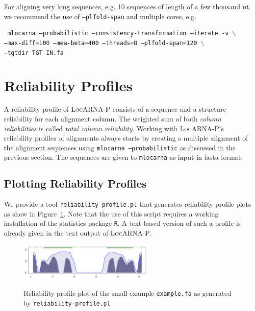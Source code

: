 \documentclass{article}
\newcommand{\LocARNAP}{\textsc{LocARNA-P}}
\newenvironment{ttbox}{%
  \begin{framed}\begin{minipage}{1.0\textwidth}\tt}%
{\end{minipage}\end{framed}\noindent}
\begin{document}
For aligning very long sequences, e.g. 10 sequences of length of a few
thousand nt, we recommend the use of \texttt{--plfold-span} and
multiple cores, e.g.
\begin{ttbox}
  mlocarna --probabilistic --consistency-transformation --iterate -v $\backslash$ \\
  \hphantom{mlocarna}  --max-diff=100 --mea-beta=400 --threads=8 --plfold-span=120 $\backslash$ \\
  \hphantom{mlocarna} --tgtdir TGT IN.fa
\end{ttbox}

\section{Reliability Profiles}

A reliability profile of \LocARNAP{} consists of a sequence and a
structure reliability for each alignment column. The weighted sum of
both \emph{column reliabilities} is called \emph{total column
  reliability}.  Working with \LocARNAP's reliability profiles of
alignments always starts by creating a multiple alignment of the
alignment sequences using \texttt{mlocarna --probabilistic} as
discussed in the previous section. The sequences are given to
\texttt{mlocarna} as input in fasta format.

\subsection{Plotting Reliability Profiles}

We provide a tool \texttt{reliability-profile.pl} that generates
reliability profile plots as show in Figure~\ref{fig:relprof}. Note
that the use of this script requires a working installation of the
statistics package \texttt{R}. A text-based version of such a profile
is already given in the text output of \LocARNAP{}.

\begin{figure}[h]
  \centering
  \includegraphics[width=0.6\textwidth]{Figs/relprof.pdf}
  \caption{Reliability profile plot of the small example
    \texttt{example.fa} as generated by
    \texttt{reliability-profile.pl}}
  \label{fig:relprof}
\end{figure}
\end{document}
